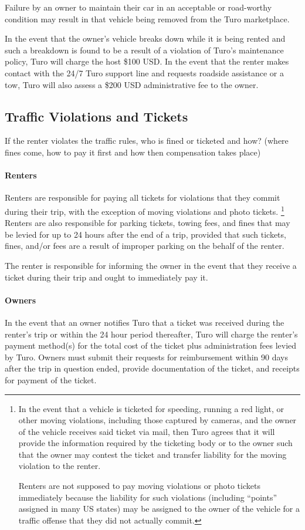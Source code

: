 \documentclass[review,12pt]{elsarticle}
\begin{document}
    Failure by an owner to maintain their car in an acceptable or road-worthy condition may result in that vehicle being removed from the Turo marketplace.

    In the event that the owner's vehicle breaks down while it is being rented and such a breakdown is found to be a result of a violation of Turo's maintenance policy, Turo will charge the host \$100 USD. In the event that the renter makes contact with the 24/7 Turo support line and requests roadside assistance or a tow, Turo will also assess a \$200 USD administrative fee to the owner.
  \subsection{Traffic Violations and Tickets}
  If the renter violates the traffic rules, who is fined or ticketed and how? (where fines come, how to pay it first and how then compensation takes place)
    \paragraph{Renters}
    Renters are responsible for paying all tickets for violations that they commit during their trip, with the exception of moving violations and photo tickets.
      \footnote{In the event that a vehicle is ticketed for speeding, running a red light, or other moving violations, including those captured by cameras, and the owner of the vehicle receives said ticket via mail, then Turo agrees that it will provide the information required by the ticketing body or to the owner such that the owner may contest the ticket and transfer liability for the moving violation to the renter.

      Renters are not supposed to pay moving violations or photo tickets immediately because the liability for such violations (including ``points'' assigned in many US states) may be assigned to the owner of the vehicle for a traffic offense that they did not actually commit.
      }
    Renters are also responsible for parking tickets, towing fees, and fines that may be levied for up to 24 hours after the end of a trip, provided that such tickets, fines, and/or fees are a result of improper parking on the behalf of the renter.

    The renter is responsible for informing the owner in the event that they receive a ticket during their trip and ought to immediately pay it.

    \paragraph{Owners}
    In the event that an owner notifies Turo that a ticket was received during the renter's trip or within the 24 hour period thereafter, Turo will charge the renter's payment method(s) for the total cost of the ticket plus administration fees levied by Turo. Owners must submit their requests for reimbursement within 90 days after the trip in question ended, provide documentation of the ticket, and receipts for payment of the ticket.
\end{document}
